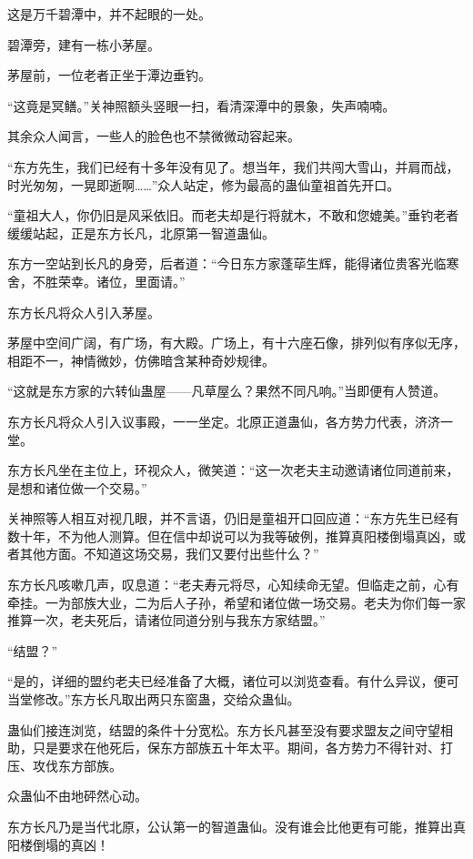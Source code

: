 \begin{this_body}
这是万千碧潭中，并不起眼的一处。

碧潭旁，建有一栋小茅屋。

茅屋前，一位老者正坐于潭边垂钓。

“这竟是冥鳝。”关神照额头竖眼一扫，看清深潭中的景象，失声喃喃。

其余众人闻言，一些人的脸色也不禁微微动容起来。

“东方先生，我们已经有十多年没有见了。想当年，我们共闯大雪山，并肩而战，时光匆匆，一晃即逝啊……”众人站定，修为最高的蛊仙童祖首先开口。

“童祖大人，你仍旧是风采依旧。而老夫却是行将就木，不敢和您媲美。”垂钓老者缓缓站起，正是东方长凡，北原第一智道蛊仙。

东方一空站到长凡的身旁，后者道：“今日东方家蓬荜生辉，能得诸位贵客光临寒舍，不胜荣幸。诸位，里面请。”

东方长凡将众人引入茅屋。

茅屋中空间广阔，有广场，有大殿。广场上，有十六座石像，排列似有序似无序，相距不一，神情微妙，仿佛暗含某种奇妙规律。

“这就是东方家的六转仙蛊屋——凡草屋么？果然不同凡响。”当即便有人赞道。

东方长凡将众人引入议事殿，一一坐定。北原正道蛊仙，各方势力代表，济济一堂。

东方长凡坐在主位上，环视众人，微笑道：“这一次老夫主动邀请诸位同道前来，是想和诸位做一个交易。”

关神照等人相互对视几眼，并不言语，仍旧是童祖开口回应道：“东方先生已经有数十年，不为他人测算。但在信中却说可以为我等破例，推算真阳楼倒塌真凶，或者其他方面。不知道这场交易，我们又要付出些什么？”

东方长凡咳嗽几声，叹息道：“老夫寿元将尽，心知续命无望。但临走之前，心有牵挂。一为部族大业，二为后人子孙，希望和诸位做一场交易。老夫为你们每一家推算一次，老夫死后，请诸位同道分别与我东方家结盟。”

“结盟？”

“是的，详细的盟约老夫已经准备了大概，诸位可以浏览查看。有什么异议，便可当堂修改。”东方长凡取出两只东窗蛊，交给众蛊仙。

蛊仙们接连浏览，结盟的条件十分宽松。东方长凡甚至没有要求盟友之间守望相助，只是要求在他死后，保东方部族五十年太平。期间，各方势力不得针对、打压、攻伐东方部族。

众蛊仙不由地砰然心动。

东方长凡乃是当代北原，公认第一的智道蛊仙。没有谁会比他更有可能，推算出真阳楼倒塌的真凶！


\end{this_body}
